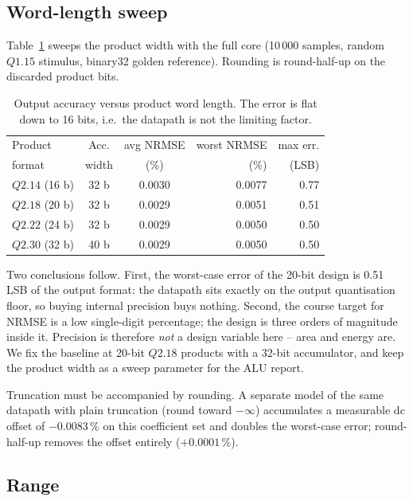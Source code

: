 \documentclass[conference]{IEEEtran}
\newcommand{\qf}[2]{Q#1.#2}
\begin{document}
\subsection{Word-length sweep}

Table~\ref{tab:pw} sweeps the product width with the full core
(10\,000 samples, random $\qf{1}{15}$ stimulus, binary32 golden reference).
Rounding is round-half-up on the discarded product bits.

\begin{table}[t]
\centering
\caption{Output accuracy versus product word length. The error is flat down to
16 bits, i.e.\ the datapath is not the limiting factor.}
\label{tab:pw}
\begin{tabular}{@{}lccrr@{}}
\toprule
Product & Acc. & avg NRMSE & worst NRMSE & max err.\\
format  & width & (\%)     & (\%)        & (LSB)\\
\midrule
$\qf{2}{14}$ (16 b) & 32 b & 0.0030 & 0.0077 & 0.77\\
$\qf{2}{18}$ (20 b) & 32 b & 0.0029 & 0.0051 & 0.51\\
$\qf{2}{22}$ (24 b) & 32 b & 0.0029 & 0.0050 & 0.50\\
$\qf{2}{30}$ (32 b) & 40 b & 0.0029 & 0.0050 & 0.50\\
\bottomrule
\end{tabular}
\end{table}

Two conclusions follow. First, the worst-case error of the 20-bit design is
0.51 LSB of the output format: the datapath sits exactly on the output
quantisation floor, so buying internal precision buys nothing. Second, the
course target for NRMSE is a low single-digit percentage; the design is three
orders of magnitude inside it. Precision is therefore \emph{not} a design
variable here -- area and energy are. We fix the baseline at 20-bit
$\qf{2}{18}$ products with a 32-bit accumulator, and keep the product width as
a sweep parameter for the ALU report.

Truncation must be accompanied by rounding. A separate model of the same
datapath with plain truncation (round toward $-\infty$) accumulates a
measurable dc offset of $-0.0083\,\%$ on this coefficient set and doubles the
worst-case error; round-half-up removes the offset entirely
($+0.0001\,\%$).

\subsection{Range}
\end{document}
